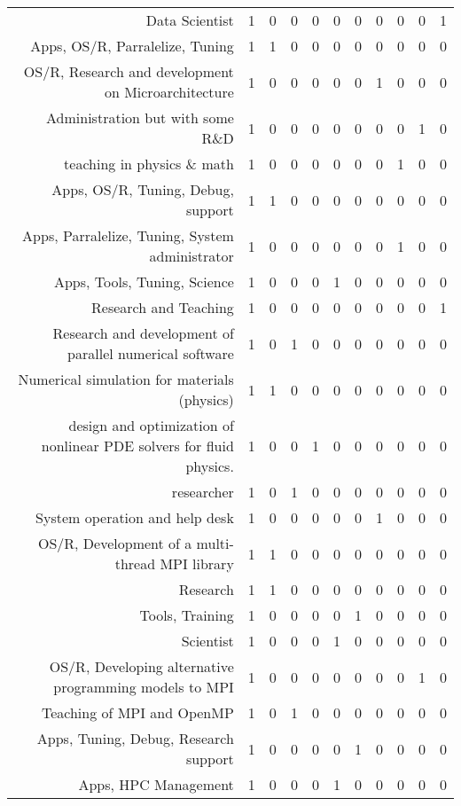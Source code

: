 {\begin{landscape}
\begin{longtable}[htb]{r|c|c|c|c|c|c|c|c|c|c}
{Data Scientist} & 1 & 0 & 0 & 0 & 0 & 0 & 0 & 0 & 0 & 1 \\%
{Apps, OS/R, Parralelize, Tuning} & 1 & 1 & 0 & 0 & 0 & 0 & 0 & 0 & 0 & 0 \\%
{OS/R, Research and development on Microarchitecture} & 1 & 0 & 0 & 0 & 0 & 0 & 1 & 0 & 0 & 0 \\%
{Administration but with some R\&D} & 1 & 0 & 0 & 0 & 0 & 0 & 0 & 0 & 1 & 0 \\%
{teaching in physics \& math} & 1 & 0 & 0 & 0 & 0 & 0 & 0 & 1 & 0 & 0 \\%
{Apps, OS/R, Tuning, Debug, support} & 1 & 1 & 0 & 0 & 0 & 0 & 0 & 0 & 0 & 0 \\%
{Apps, Parralelize, Tuning, System administrator} & 1 & 0 & 0 & 0 & 0 & 0 & 0 & 1 & 0 & 0 \\%
{Apps, Tools, Tuning, Science} & 1 & 0 & 0 & 0 & 1 & 0 & 0 & 0 & 0 & 0 \\%
{Research and Teaching} & 1 & 0 & 0 & 0 & 0 & 0 & 0 & 0 & 0 & 1 \\%
{Research and development of parallel numerical software} & 1 & 0 & 1 & 0 & 0 & 0 & 0 & 0 & 0 & 0 \\%
{Numerical simulation for materials (physics)} & 1 & 1 & 0 & 0 & 0 & 0 & 0 & 0 & 0 & 0 \\%
{design and optimization of nonlinear PDE solvers for fluid physics.} & 1 & 0 & 0 & 1 & 0 & 0 & 0 & 0 & 0 & 0 \\%
{researcher} & 1 & 0 & 1 & 0 & 0 & 0 & 0 & 0 & 0 & 0 \\%
{System operation and help desk} & 1 & 0 & 0 & 0 & 0 & 0 & 1 & 0 & 0 & 0 \\%
{OS/R, Development of a  multi-thread MPI library} & 1 & 1 & 0 & 0 & 0 & 0 & 0 & 0 & 0 & 0 \\%
{Research} & 1 & 1 & 0 & 0 & 0 & 0 & 0 & 0 & 0 & 0 \\%
{Tools, Training} & 1 & 0 & 0 & 0 & 0 & 1 & 0 & 0 & 0 & 0 \\%
{Scientist} & 1 & 0 & 0 & 0 & 1 & 0 & 0 & 0 & 0 & 0 \\%
{OS/R, Developing alternative programming models to MPI} & 1 & 0 & 0 & 0 & 0 & 0 & 0 & 0 & 1 & 0 \\%
{Teaching of MPI and OpenMP} & 1 & 0 & 1 & 0 & 0 & 0 & 0 & 0 & 0 & 0 \\%
{Apps, Tuning, Debug, Research support} & 1 & 0 & 0 & 0 & 0 & 1 & 0 & 0 & 0 & 0 \\%
{Apps, HPC Management} & 1 & 0 & 0 & 0 & 1 & 0 & 0 & 0 & 0 & 0 \\%

\end{longtable}
\end{landscape}}
